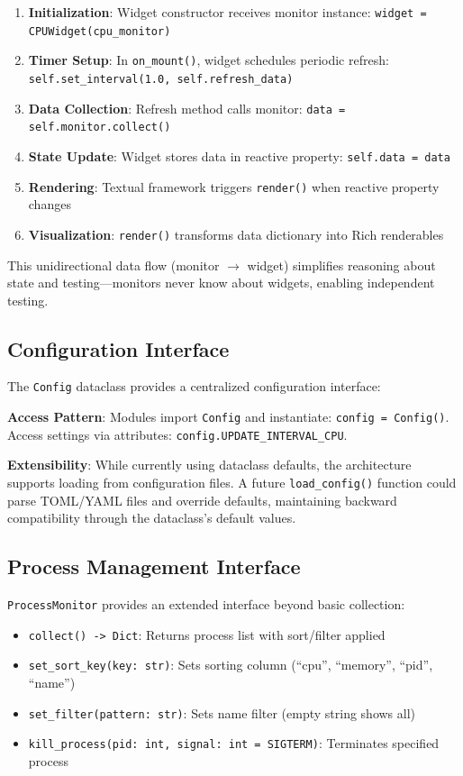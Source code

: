 \documentclass[12pt,a4paper,oneside]{report}
\begin{document}
\begin{enumerate}
    \item \textbf{Initialization}: Widget constructor receives monitor instance: \texttt{widget = CPUWidget(cpu\_monitor)}
    \item \textbf{Timer Setup}: In \texttt{on\_mount()}, widget schedules periodic refresh: \texttt{self.set\_interval(1.0, self.refresh\_data)}
    \item \textbf{Data Collection}: Refresh method calls monitor: \texttt{data = self.monitor.collect()}
    \item \textbf{State Update}: Widget stores data in reactive property: \texttt{self.data = data}
    \item \textbf{Rendering}: Textual framework triggers \texttt{render()} when reactive property changes
    \item \textbf{Visualization}: \texttt{render()} transforms data dictionary into Rich renderables
\end{enumerate}

This unidirectional data flow (monitor $\rightarrow$ widget) simplifies reasoning about state and testing---monitors never know about widgets, enabling independent testing.

\subsection{Configuration Interface}

The \texttt{Config} dataclass provides a centralized configuration interface:

\textbf{Access Pattern}: Modules import \texttt{Config} and instantiate: \texttt{config = Config()}. Access settings via attributes: \texttt{config.UPDATE\_INTERVAL\_CPU}.

\textbf{Extensibility}: While currently using dataclass defaults, the architecture supports loading from configuration files. A future \texttt{load\_config()} function could parse TOML/YAML files and override defaults, maintaining backward compatibility through the dataclass's default values.

\subsection{Process Management Interface}

\texttt{ProcessMonitor} provides an extended interface beyond basic collection:

\begin{itemize}
    \item \texttt{collect() -> Dict}: Returns process list with sort/filter applied
    \item \texttt{set\_sort\_key(key: str)}: Sets sorting column (``cpu'', ``memory'', ``pid'', ``name'')
    \item \texttt{set\_filter(pattern: str)}: Sets name filter (empty string shows all)
    \item \texttt{kill\_process(pid: int, signal: int = SIGTERM)}: Terminates specified process
\end{itemize}
\end{document}

